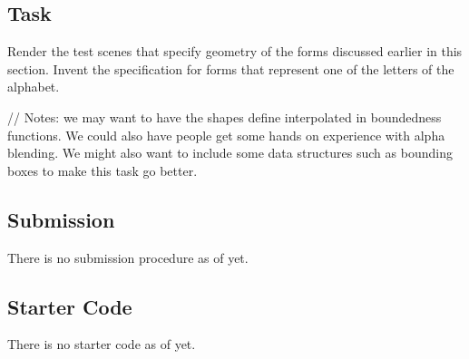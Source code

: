 \documentclass[12pt, letterpaper]{article}
\begin{document}
\subsection{Task}

Render the test scenes that specify geometry of the forms discussed earlier in this section.
Invent the specification for forms that represent one of the letters of the alphabet.

// Notes: we may want to have the shapes define interpolated in boundedness functions. We could also have people get some hands on experience with alpha blending. We might also want to include some data structures such as bounding boxes to make this task go better.

\subsection{Submission}

There is no submission procedure as of yet.

\subsection{Starter Code}

There is no starter code as of yet.

\end{document}
